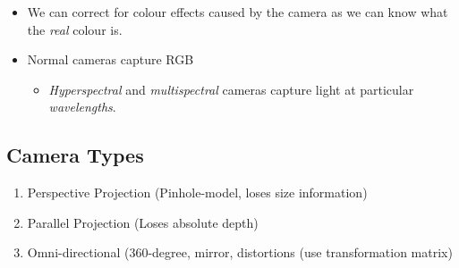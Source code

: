 \documentclass[english, 10pt]{article}
\begin{document}
\begin{itemize}
\itemsep1pt\parskip0pt
\item
  We can correct for colour effects caused by the camera as we can know
  what the \emph{real} colour is.
\item
  Normal cameras capture RGB

  \begin{itemize}
  \itemsep1pt\parskip0pt
  \item
    \emph{Hyperspectral} and \emph{multispectral} cameras capture light
    at particular \emph{wavelengths}.
  \end{itemize}
\end{itemize}

\subsection{Camera Types}\label{camera-types}

\begin{enumerate}
\def\labelenumi{\arabic{enumi}.}
\itemsep1pt\parskip0pt

\item
  Perspective Projection (Pinhole-model, loses size information)

\item
  Parallel Projection (Loses absolute depth)

\item
  Omni-directional (360-degree, mirror, distortions (use transformation matrix)

\end{enumerate}
\end{document}
